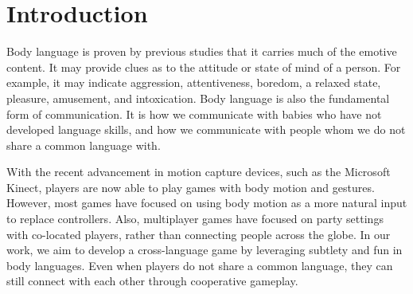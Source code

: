 \documentclass{chi-ext}
\def\plaingeneralterms{Documentation, Standardization}
\begin{document}

\section{Introduction}

Body language is proven by previous studies\cite{BL1,BL2} that it carries much of the emotive content. It may provide clues as to the attitude or state of mind of a person. For example, it may indicate aggression, attentiveness, boredom, a relaxed state, pleasure, amusement, and intoxication\cite{BLWiki}.
Body language is also the fundamental form of communication. 
It is how we communicate with babies who have not developed language skills, and how we communicate with people whom we do not share a common language with.

With the recent advancement in motion capture devices, such as the Microsoft Kinect\cite{Kinect}, players are now able to play games with body motion and gestures.
However, most games have focused on using body motion as a more natural input to replace controllers.
Also, multiplayer games have focused on party settings with co-located players, rather than connecting people across the globe.
In our work, we aim to develop a cross-language game by leveraging subtlety and fun in body languages. Even when players do not share a common language, they can still connect with each other through cooperative gameplay.

\end{document}
